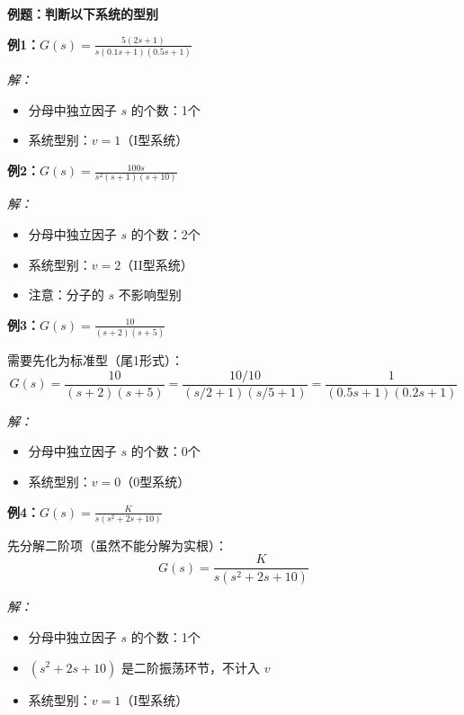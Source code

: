 \vspace{0.3cm}
\textbf{例题：判断以下系统的型别}

\begin{minipage}[t]{0.48\textwidth}
\textbf{例1：}$\displaystyle G(s) = \frac{5(2s+1)}{s(0.1s+1)(0.5s+1)}$

\textit{解：}
\begin{itemize}
    \item 分母中独立因子 $s$ 的个数：1个
    \item 系统型别：$v = 1$（I型系统）
\end{itemize}
\end{minipage}\hfill
\begin{minipage}[t]{0.48\textwidth}
\textbf{例2：}$\displaystyle G(s) = \frac{100s}{s^2(s+1)(s+10)}$

\textit{解：}
\begin{itemize}
    \item 分母中独立因子 $s$ 的个数：2个
    \item 系统型别：$v = 2$（II型系统）
    \item 注意：分子的 $s$ 不影响型别
\end{itemize}
\end{minipage}

\vspace{0.2cm}
\begin{minipage}[t]{0.48\textwidth}
\textbf{例3：}$\displaystyle G(s) = \frac{10}{(s+2)(s+5)}$

需要先化为标准型（尾1形式）：
$$G(s) = \frac{10}{(s+2)(s+5)} = \frac{10/10}{(s/2+1)(s/5+1)} = \frac{1}{(0.5s+1)(0.2s+1)}$$

\textit{解：}
\begin{itemize}
    \item 分母中独立因子 $s$ 的个数：0个
    \item 系统型别：$v = 0$（0型系统）
\end{itemize}
\end{minipage}\hfill
\begin{minipage}[t]{0.48\textwidth}
\textbf{例4：}$\displaystyle G(s) = \frac{K}{s(s^2+2s+10)}$

先分解二阶项（虽然不能分解为实根）：
$$G(s) = \frac{K}{s(s^2+2s+10)}$$

\textit{解：}
\begin{itemize}
    \item 分母中独立因子 $s$ 的个数：1个
    \item $(s^2+2s+10)$ 是二阶振荡环节，不计入 $v$
    \item 系统型别：$v = 1$（I型系统）
\end{itemize}
\end{minipage}

